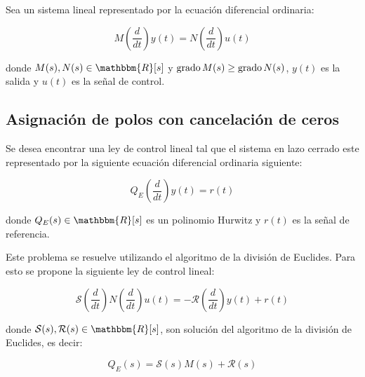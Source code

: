         Sea un sistema lineal representado por la ecuación diferencial ordinaria:

        \begin{equation} \label{eq:anillos1}
            M \left( \frac{d}{dt} \right) y(t) = N \left( \frac{d}{dt} \right) u(t)
        \end{equation}

        donde $M(s), N(s) \in \mathbbm{R}[s]$ y $\operatorname{grado}{M(s)} \ge \operatorname{grado}{N(s)}$, $y(t)$ es la salida y $u(t)$ es la señal de control.


        \subsection{Asignación de polos con cancelación de ceros}

            \begin{problema}
                Se desea encontrar una ley de control lineal tal que el sistema en lazo cerrado este representado por la siguiente ecuación diferencial ordinaria siguiente:

                \begin{equation}
                    Q_E \left( \frac{d}{dt} \right) y(t) = r(t)
                \end{equation}

                donde $Q_E(s) \in \mathbbm{R}[s]$ es un polinomio Hurwitz y $r(t)$ es la señal de referencia.
            \end{problema}

            Este problema se resuelve utilizando el algoritmo de la división de Euclides. Para esto se propone la siguiente ley de control lineal:

            \begin{equation} \label{eq:anillos2}
                \mathcal{S} \left( \frac{d}{dt} \right) N \left( \frac{d}{dt} \right) u(t) = - \mathcal{R} \left( \frac{d}{dt} \right) y(t) + r(t)
            \end{equation}

            donde $\mathcal{S}(s), \mathcal{R}(s) \in \mathbbm{R}[s]$, son solución del algoritmo de la división de Euclides, es decir:

            \begin{equation} \label{eq:anillos3}
                Q_E(s) = \mathcal{S}(s) M(s) + \mathcal{R}(s)
            \end{equation}

